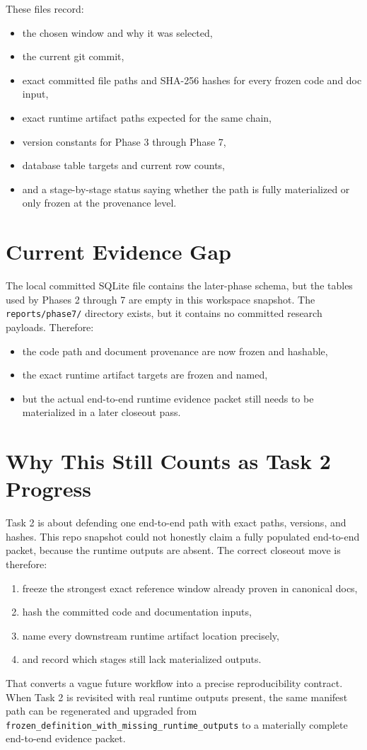 \documentclass{article}
\begin{document}
These files record:
\begin{itemize}
\item the chosen window and why it was selected,
\item the current git commit,
\item exact committed file paths and SHA-256 hashes for every frozen code and doc input,
\item exact runtime artifact paths expected for the same chain,
\item version constants for Phase 3 through Phase 7,
\item database table targets and current row counts,
\item and a stage-by-stage status saying whether the path is fully materialized or only frozen at the provenance level.
\end{itemize}

\section*{Current Evidence Gap}
The local committed SQLite file contains the later-phase schema, but the tables used by Phases 2 through 7 are empty in this workspace snapshot. The \texttt{reports/phase7/} directory exists, but it contains no committed research payloads. Therefore:
\begin{itemize}
\item the code path and document provenance are now frozen and hashable,
\item the exact runtime artifact targets are frozen and named,
\item but the actual end-to-end runtime evidence packet still needs to be materialized in a later closeout pass.
\end{itemize}

\section*{Why This Still Counts as Task 2 Progress}
Task 2 is about defending one end-to-end path with exact paths, versions, and hashes. This repo snapshot could not honestly claim a fully populated end-to-end packet, because the runtime outputs are absent. The correct closeout move is therefore:
\begin{enumerate}
\item freeze the strongest exact reference window already proven in canonical docs,
\item hash the committed code and documentation inputs,
\item name every downstream runtime artifact location precisely,
\item and record which stages still lack materialized outputs.
\end{enumerate}

That converts a vague future workflow into a precise reproducibility contract. When Task 2 is revisited with real runtime outputs present, the same manifest path can be regenerated and upgraded from \texttt{frozen\_definition\_with\_missing\_runtime\_outputs} to a materially complete end-to-end evidence packet.
\end{document}
